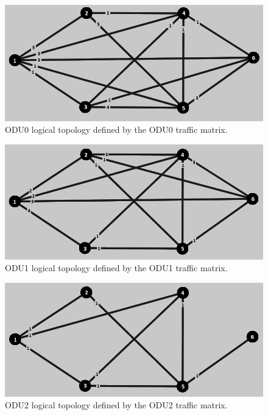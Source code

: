 \begin{figure}[H]
\centering
\includegraphics[width=13cm]{sdf/heuristic/opaque_protection/low/logical_topology_odu0_low}
\caption{ODU0 logical topology defined by the ODU0 traffic matrix.}
\label{logical_ODU0_protec_ref_low_heuristic}
\end{figure}

\begin{figure}[H]
\centering
\includegraphics[width=13cm]{sdf/heuristic/opaque_protection/low/logical_topology_odu1_low}
\caption{ODU1 logical topology defined by the ODU1 traffic matrix.}
\label{logical_ODU1_protec_ref_low_heuristic}
\end{figure}

\begin{figure}[H]
\centering
\includegraphics[width=13cm]{sdf/heuristic/opaque_protection/low/logical_topology_odu2_low}
\caption{ODU2 logical topology defined by the ODU2 traffic matrix.}
\label{logical_ODU2_protec_ref_low_heuristic}
\end{figure}

